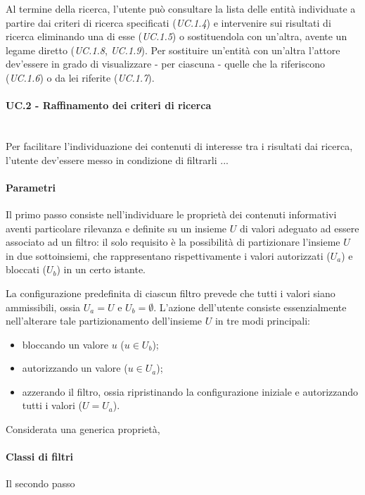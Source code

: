 Al termine della ricerca, l'utente può consultare la lista delle entità individuate a partire dai criteri di ricerca specificati (\textit{UC.1.4}) e intervenire sui risultati di ricerca eliminando una di esse (\textit{UC.1.5}) o sostituendola con un'altra, avente un legame diretto (\textit{UC.1.8}, \textit{UC.1.9}). Per sostituire un'entità con un'altra l'attore dev'essere in grado di visualizzare - per ciascuna - quelle che la riferiscono (\textit{UC.1.6}) o da lei riferite (\textit{UC.1.7}).

\paragraph{UC.2 - Raffinamento dei criteri di ricerca} \hfill \\
Per facilitare l'individuazione dei contenuti di interesse tra i risultati dai ricerca, l'utente dev'essere messo in condizione di filtrarli ...

\paragraph{Parametri}
Il primo passo consiste nell'individuare le proprietà dei contenuti informativi aventi particolare rilevanza e definite su un insieme $U$ di valori adeguato ad essere associato ad un filtro: il solo requisito è la possibilità di partizionare l'insieme $U$ in due sottoinsiemi, che rappresentano rispettivamente i valori autorizzati ($U_a$) e bloccati ($U_b$) in un certo istante.


La configurazione predefinita di ciascun filtro prevede che tutti i valori siano ammissibili, ossia $U_a = U$ e $U_b = \emptyset$. L'azione dell'utente consiste essenzialmente nell'alterare tale partizionamento dell'insieme $U$ in tre modi principali:
\begin{itemize}
	\item bloccando un valore $u$ ($u \in U_b$);
	\item autorizzando un valore ($u \in U_a$);
	\item azzerando il filtro, ossia ripristinando la configurazione iniziale e autorizzando tutti i valori ($U = U_a$).
\end{itemize}

Considerata una generica proprietà, 


\paragraph{Classi di filtri}
Il secondo passo


